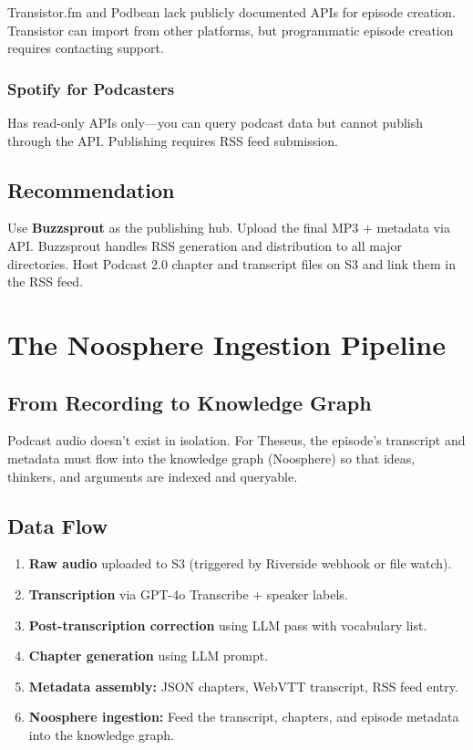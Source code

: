 \documentclass[11pt,letterpaper]{article}
\begin{document}
Transistor.fm and Podbean lack publicly documented APIs for episode creation. Transistor can import from other platforms, but programmatic episode creation requires contacting support.

\subsubsection{Spotify for Podcasters}

Has read-only APIs only—you can query podcast data but cannot publish through the API. Publishing requires RSS feed submission.

\subsection{Recommendation}

Use \textbf{Buzzsprout} as the publishing hub. Upload the final MP3 + metadata via API. Buzzsprout handles RSS generation and distribution to all major directories. Host Podcast 2.0 chapter and transcript files on S3 and link them in the RSS feed.

\vspace{12pt}

\section{The Noosphere Ingestion Pipeline}

\subsection{From Recording to Knowledge Graph}

Podcast audio doesn't exist in isolation. For Theseus, the episode's transcript and metadata must flow into the knowledge graph (Noosphere) so that ideas, thinkers, and arguments are indexed and queryable.

\subsection{Data Flow}

\begin{enumerate}
  \item \textbf{Raw audio} uploaded to S3 (triggered by Riverside webhook or file watch).
  \item \textbf{Transcription} via GPT-4o Transcribe + speaker labels.
  \item \textbf{Post-transcription correction} using LLM pass with vocabulary list.
  \item \textbf{Chapter generation} using LLM prompt.
  \item \textbf{Metadata assembly:} JSON chapters, WebVTT transcript, RSS feed entry.
  \item \textbf{Noosphere ingestion:} Feed the transcript, chapters, and episode metadata into the knowledge graph.
\end{enumerate}
\end{document}
